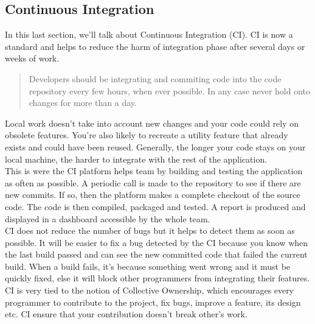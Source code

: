 \subsection{Continuous Integration}\label{subsec:continuous-integration}
In this last section, we'll talk about Continuous Integration (CI).
CI is now a standard and helps to reduce the harm of integration phase
after several days or weeks of work.
\begin{quotation}
    Developers should be integrating and commiting code into the code
    repository every few hours, when ever possible.
    In any case never hold onto changes for more than a day.
\end{quotation}
Local work doesn't take into account new changes and your code could rely
on obsolete features.
You're also likely to recreate a utility feature that already exists and
could have been reused.
Generally, the longer your code stays on your local machine, the harder
to integrate with the rest of the application. \\
\newline
This is were the CI platform helps team by building and testing
the application as often as possible.
A periodic call is made to the repository to see if there are new
commits.
If so, then the platform makes a complete checkout of the source code.
The code is then compiled, packaged and tested.
A report is produced and displayed in a dashboard accessible by the
whole team. \\
\newline
CI does not reduce the number of bugs but it helps to detect them as soon
as possible.
It will be easier to fix a bug detected by the CI because you know when
the last build passed and can see the new committed code that failed
the current build.
When a build fails, it's because something went wrong and it must be
quickly fixed, else it will block other programmers from integrating
their features. \\
\newline
CI is very tied to the notion of Collective Ownership, which
encourages every programmer to contribute to the project, fix bugs,
improve a feature, its design etc.
CI ensure that your contribution doesn't break other's work.

